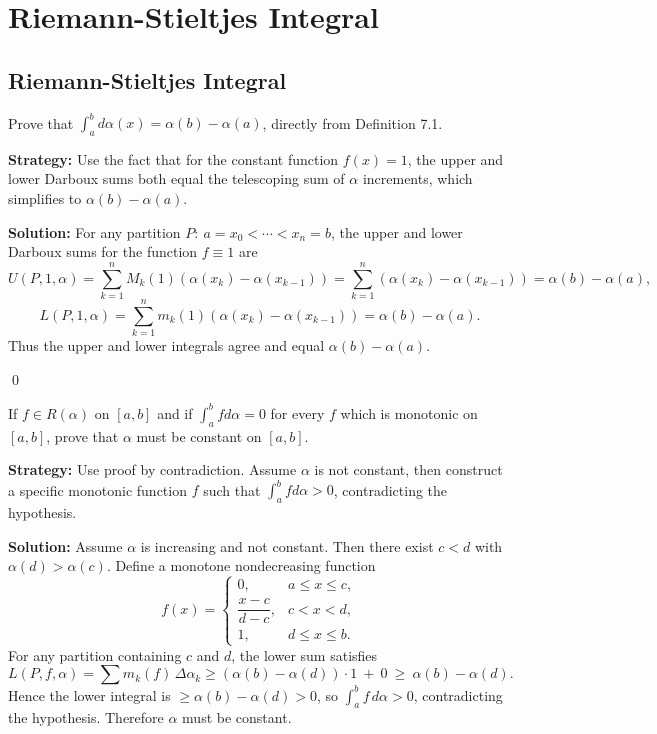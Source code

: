 \chapter{Riemann-Stieltjes Integral}

\section{Riemann-Stieltjes Integral}


\begin{problembox}
Prove that $\int_a^b d\alpha(x) = \alpha(b) - \alpha(a)$, directly from Definition 7.1.
\end{problembox}

\noindent\textbf{Strategy:} Use the fact that for the constant function $f(x) = 1$, the upper and lower Darboux sums both equal the telescoping sum of $\alpha$ increments, which simplifies to $\alpha(b) - \alpha(a)$.

\bigskip\noindent\textbf{Solution:}
For any partition $P:\ a=x_0<\cdots<x_n=b$, the upper and lower Darboux sums for the function $f\equiv 1$ are
\[U(P,1,\alpha)=\sum_{k=1}^n M_k(1)(\alpha(x_k)-\alpha(x_{k-1}))=\sum_{k=1}^n (\alpha(x_k)-\alpha(x_{k-1}))=\alpha(b)-\alpha(a),\]
\[L(P,1,\alpha)=\sum_{k=1}^n m_k(1)(\alpha(x_k)-\alpha(x_{k-1}))=\alpha(b)-\alpha(a).\]
Thus the upper and lower integrals agree and equal $\alpha(b)-\alpha(a)$.




\qed
\begin{problembox}
If $f \in R(\alpha)$ on $[a, b]$ and if $\int_a^b f d\alpha = 0$ for every $f$ which is monotonic on $[a, b]$, prove that $\alpha$ must be constant on $[a, b]$.
\end{problembox}

\noindent\textbf{Strategy:} Use proof by contradiction. Assume $\alpha$ is not constant, then construct a specific monotonic function $f$ such that $\int_a^b f d\alpha > 0$, contradicting the hypothesis.

\bigskip\noindent\textbf{Solution:}
Assume $\alpha$ is increasing and not constant. Then there exist $c<d$ with $\alpha(d)>\alpha(c)$. Define a monotone nondecreasing function
\[
f(x)=\begin{cases}
0,& a\le x\le c,\\
\dfrac{x-c}{d-c},& c<x<d,\\
1,& d\le x\le b.
\end{cases}
\]
For any partition containing $c$ and $d$, the lower sum satisfies
\[L(P,f,\alpha)=\sum m_k(f)\,\Delta\alpha_k\ge (\alpha(b)-\alpha(d))\cdot 1\ +\ 0\ \ge\ \alpha(b)-\alpha(d).
\]
Hence the lower integral is $\ge \alpha(b)-\alpha(d)>0$, so $\int_a^b f\,d\alpha>0$, contradicting the hypothesis. Therefore $\alpha$ must be constant.




